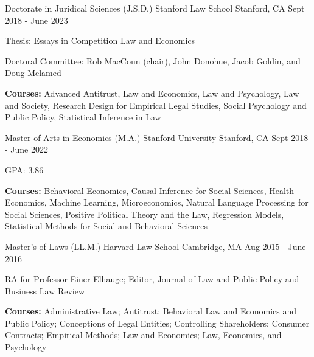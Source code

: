 

\begin{cventries}

  \cventry
    {Doctorate in Juridical Sciences (J.S.D.)} %
    {Stanford Law School} %
    {Stanford, CA} %
    {Sept 2018 - June 2023} %
    {
      \begin{cvitems} %
        \item {Thesis: Essays in Competition Law and Economics}
        \item {Doctoral Committee: Rob MacCoun (chair), John Donohue, Jacob Goldin, and Doug Melamed}
        \item {\textbf{Courses:} Advanced Antitrust, Law and Economics, Law and Psychology, Law and Society, Research Design for Empirical Legal Studies, Social Psychology and Public Policy, Statistical Inference in Law}
      \end{cvitems}
    }
    
  \cventry
    {Master of Arts in Economics (M.A.)} %
    {Stanford University} %
    {Stanford, CA} %
    {Sept 2018 - June 2022} %
    {
      \begin{cvitems} %
        \item {GPA: 3.86}
        \item {\textbf{Courses:} Behavioral Economics, Causal Inference for Social Sciences, Health Economics, Machine Learning, Microeconomics, Natural Language Processing for Social Sciences, Positive Political Theory and the Law, Regression Models, Statistical Methods for Social and Behavioral Sciences }
      \end{cvitems}
    }
    
  \cventry
    {Master's of Laws (LL.M.)} %
    {Harvard Law School} %
    {Cambridge, MA} %
    {Aug 2015 - June 2016} %
    {
      \begin{cvitems} %
        \item {RA for Professor Einer Elhauge; Editor, Journal of Law and Public Policy and Business Law Review}
        \item {\textbf{Courses:} Administrative Law; Antitrust; Behavioral Law and Economics and Public Policy; Conceptions of Legal Entities; Controlling Shareholders; Consumer Contracts; Empirical Methods; Law and Economics; Law, Economics, and Psychology}
      \end{cvitems}
    }


\end{cventries}
